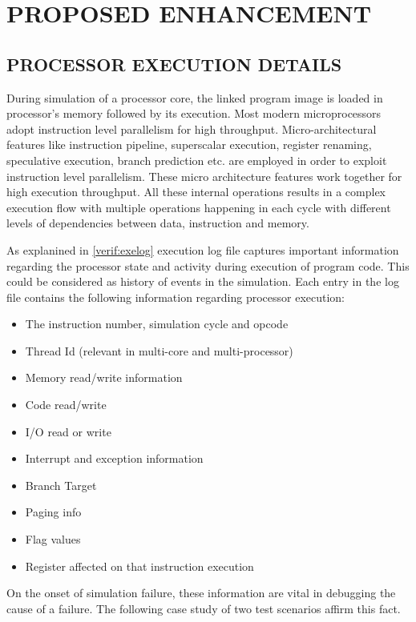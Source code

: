 \chapter{PROPOSED ENHANCEMENT}
\label{chap:enhancement.tex}

\section {PROCESSOR EXECUTION DETAILS}

During simulation of a processor core, the linked program image is loaded in processor's memory followed by its execution. Most modern microprocessors adopt instruction level parallelism for high throughput. Micro-architectural features like instruction pipeline, superscalar execution, register renaming, speculative execution, branch prediction etc. are employed in order to exploit instruction level parallelism.  These micro architecture features work together for high execution throughput. All these internal operations results in a complex execution flow with multiple operations happening in each cycle with different levels of dependencies between data, instruction and memory.


As explanined in \ref{verif:exelog} execution log file captures important information regarding the processor state and activity during execution of program code. This could be considered as history of events in the simulation. Each entry in the log file contains the following information regarding processor execution:
\begin{itemize}
	\item The instruction number, simulation cycle and opcode
	\item Thread Id (relevant in multi-core and multi-processor)
	\item Memory read/write information
	\item Code read/write
	\item I/O read or write
	\item Interrupt and exception information
	\item Branch Target
	\item Paging info
	\item Flag values
	\item Register affected on that instruction execution
\end{itemize}
On the onset of simulation failure, these information are vital in debugging the cause of a failure. The following case study of two test scenarios affirm this fact.

